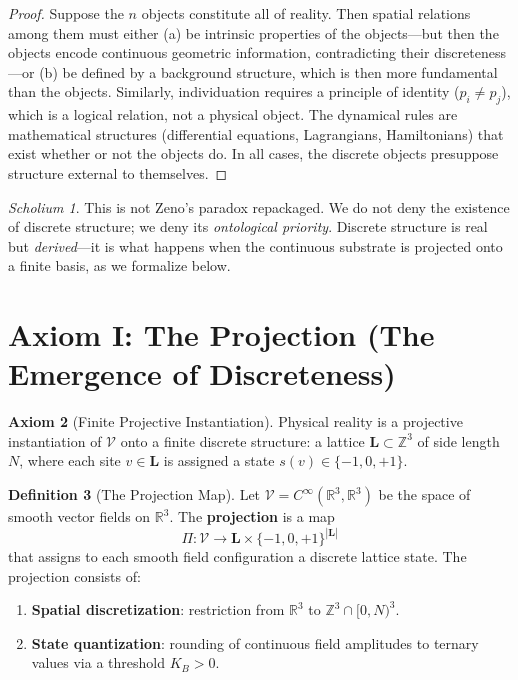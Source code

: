 \documentclass[11pt,twoside]{article}
\theoremstyle{definition}
\newtheorem{axiom}{Axiom}
\newtheorem{definition}[axiom]{Definition}
\theoremstyle{plain}
\theoremstyle{remark}
\newtheorem{scholium}[axiom]{Scholium}
\newcommand{\Void}{\mathcal{V}}
\newcommand{\Lattice}{\mathbf{L}}
\newcommand{\Real}{\mathbb{R}}
\newcommand{\Integer}{\mathbb{Z}}
\begin{document}
\begin{proof}
Suppose the $n$ objects constitute all of reality. Then spatial relations among them must either (a) be intrinsic properties of the objects---but then the objects encode continuous geometric information, contradicting their discreteness---or (b) be defined by a background structure, which is then more fundamental than the objects. Similarly, individuation requires a principle of identity ($p_i \neq p_j$), which is a logical relation, not a physical object. The dynamical rules are mathematical structures (differential equations, Lagrangians, Hamiltonians) that exist whether or not the objects do. In all cases, the discrete objects presuppose structure external to themselves. \qedhere
\end{proof}

\begin{scholium}
This is not Zeno's paradox repackaged. We do not deny the existence of discrete structure; we deny its \emph{ontological priority}. Discrete structure is real but \emph{derived}---it is what happens when the continuous substrate is projected onto a finite basis, as we formalize below.
\end{scholium}

\section{Axiom I: The Projection (The Emergence of Discreteness)}

\begin{axiom}[Finite Projective Instantiation]\label{ax:projection}
Physical reality is a projective instantiation of $\Void$ onto a finite discrete structure: a lattice $\Lattice \subset \Integer^3$ of side length $N$, where each site $v \in \Lattice$ is assigned a state $s(v) \in \{-1, 0, +1\}$.
\end{axiom}

\begin{definition}[The Projection Map]\label{def:projection}
Let $\Void = C^\infty(\Real^3, \Real^3)$ be the space of smooth vector fields on $\Real^3$. The \textbf{projection} is a map
\begin{equation}
    \Pi: \Void \longrightarrow \Lattice \times \{-1, 0, +1\}^{|\Lattice|}
\end{equation}
that assigns to each smooth field configuration a discrete lattice state. The projection consists of:
\begin{enumerate}[label=(\roman*), nosep]
    \item \textbf{Spatial discretization}: restriction from $\Real^3$ to $\Integer^3 \cap [0,N)^3$.
    \item \textbf{State quantization}: rounding of continuous field amplitudes to ternary values via a threshold $K_B > 0$.
\end{enumerate}
\end{definition}
\end{document}
